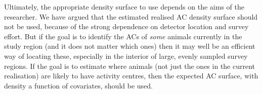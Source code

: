 \documentclass[useAMS,usenatbib,referee]{biom}
\begin{document}
Ultimately, the appropriate density surface to use depends on the aims of the researcher. We have argued that the estimated realised AC density surface should not be used, because of the strong dependence on detector location and survey effort. But if the goal is to identify the ACs of {\it some} animals currently in the study region (and it does not matter which ones) then it may well be an efficient way of locating these, especially in the interior of large, evenly sampled survey regions. If the goal is to estimate where animals (not just the ones in the current realisation) are likely to have activity centres, then the expected AC surface, with density a function of covariates, should be used.


\end{document}
